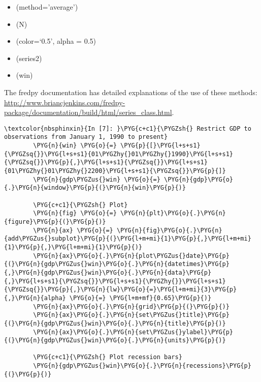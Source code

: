 \documentclass[letterpaper,10pt,openany,oneside,english]{sphinxmanual}
\begin{document}
\begin{itemize}
\item {} 
(method='average')

\item {} 
(N)

\item {} 
(color=`0.5', alpha = 0.5)

\item {} 
(series2)

\item {} 
(win)

\end{itemize}

The fredpy documentation has detailed explanations of the use of these methods: \url{http://www.briancjenkins.com/fredpy-package/documentation/build/html/series\_class.html}.

\begin{Verbatim}[commandchars=\\\{\}]
\textcolor{nbsphinxin}{In [7]: }\PYG{c+c1}{\PYGZsh{} Restrict GDP to observations from January 1, 1990 to present}
        \PYG{n}{win} \PYG{o}{=} \PYG{p}{[}\PYG{l+s+s1}{\PYGZsq{}}\PYG{l+s+s1}{01\PYGZhy{}01\PYGZhy{}1990}\PYG{l+s+s1}{\PYGZsq{}}\PYG{p}{,}\PYG{l+s+s1}{\PYGZsq{}}\PYG{l+s+s1}{01\PYGZhy{}01\PYGZhy{}2200}\PYG{l+s+s1}{\PYGZsq{}}\PYG{p}{]}
        \PYG{n}{gdp\PYGZus{}win} \PYG{o}{=} \PYG{n}{gdp}\PYG{o}{.}\PYG{n}{window}\PYG{p}{(}\PYG{n}{win}\PYG{p}{)}
        
        \PYG{c+c1}{\PYGZsh{} Plot}
        \PYG{n}{fig} \PYG{o}{=} \PYG{n}{plt}\PYG{o}{.}\PYG{n}{figure}\PYG{p}{(}\PYG{p}{)}
        \PYG{n}{ax} \PYG{o}{=} \PYG{n}{fig}\PYG{o}{.}\PYG{n}{add\PYGZus{}subplot}\PYG{p}{(}\PYG{l+m+mi}{1}\PYG{p}{,}\PYG{l+m+mi}{1}\PYG{p}{,}\PYG{l+m+mi}{1}\PYG{p}{)}
        \PYG{n}{ax}\PYG{o}{.}\PYG{n}{plot\PYGZus{}date}\PYG{p}{(}\PYG{n}{gdp\PYGZus{}win}\PYG{o}{.}\PYG{n}{datetimes}\PYG{p}{,}\PYG{n}{gdp\PYGZus{}win}\PYG{o}{.}\PYG{n}{data}\PYG{p}{,}\PYG{l+s+s1}{\PYGZsq{}}\PYG{l+s+s1}{\PYGZhy{}}\PYG{l+s+s1}{\PYGZsq{}}\PYG{p}{,}\PYG{n}{lw}\PYG{o}{=}\PYG{l+m+mi}{3}\PYG{p}{,}\PYG{n}{alpha} \PYG{o}{=} \PYG{l+m+mf}{0.65}\PYG{p}{)}
        \PYG{n}{ax}\PYG{o}{.}\PYG{n}{grid}\PYG{p}{(}\PYG{p}{)}
        \PYG{n}{ax}\PYG{o}{.}\PYG{n}{set\PYGZus{}title}\PYG{p}{(}\PYG{n}{gdp\PYGZus{}win}\PYG{o}{.}\PYG{n}{title}\PYG{p}{)}
        \PYG{n}{ax}\PYG{o}{.}\PYG{n}{set\PYGZus{}ylabel}\PYG{p}{(}\PYG{n}{gdp\PYGZus{}win}\PYG{o}{.}\PYG{n}{units}\PYG{p}{)}
        
        \PYG{c+c1}{\PYGZsh{} Plot recession bars}
        \PYG{n}{gdp\PYGZus{}win}\PYG{o}{.}\PYG{n}{recessions}\PYG{p}{(}\PYG{p}{)}
\end{Verbatim}
\end{document}
